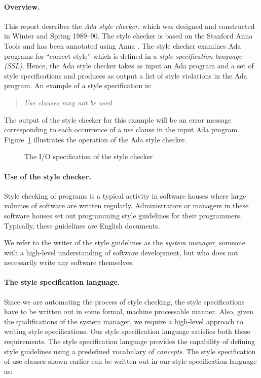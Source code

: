 \paragraph{Overview.}
This report describes the {\em Ada style checker}, which was designed and 
constructed in Winter and Spring 1989--90. The style checker is based on
the Stanford Anna Tools and has been annotated using
Anna \cite{luckham:anna-lrm}.
The style checker examines Ada~\cite{*:ada-lrm}
programs for ``correct style'' which 
is defined in a {\em style specification
language (SSL)}.  Hence, the Ada style checker takes as input an Ada program
and a set of style specifications and produces as output a list of
style violations in the Ada program.  An example of a style specification
is:

\begin{quote}\it
Use clauses may not be used
\end{quote}

\noindent
The output of the style checker for this example will be an error message
corresponding to each occurrence of a use clause in the input Ada program.
Figure~\ref{fig:black-box1} illustrates the operation of the Ada style
checker.

\begin{figure}[htbp]

\vspace{1.55in}


\caption{The I/O specification of the style checker}
\label{fig:black-box1}

\end{figure}

\paragraph{Use of the style checker.}
Style checking of programs is a typical activity in software houses
where large volumes of software are written regularly.  Administrators
or managers in these software houses set out programming style
guidelines for their programmers.  Typically, these guidelines are
English documents.

We refer to the writer of the style guidelines as the {\em system
manager}, someone with a high-level understanding
of software development, but who does not necessarily write any
software themselves.

\paragraph{The style specification language.}
Since we are automating the process of style checking, the style
specifications have to be written out in some formal, machine
processable manner.  Also, given the qualifications of the system
manager, we require a high-level approach to writing style
specifications.  Our style specification language satisfies both these
requirements.  The style specification language provides the
capability of defining style guidelines using a predefined vocabulary
of {\em concepts}.  The style specification of use clauses shown
earlier can be written out in our style specification language as:

